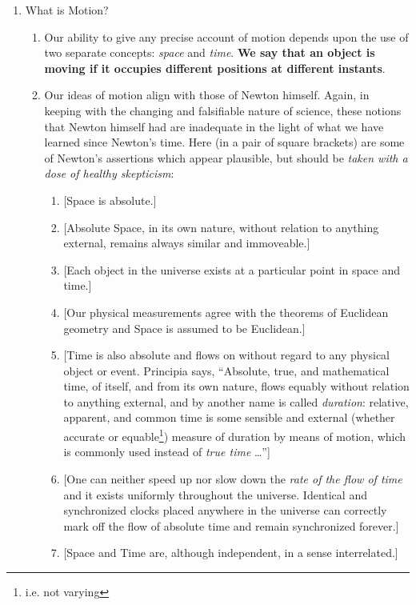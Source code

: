 \documentclass[12pt,a4paper]{book}
\begin{document}
\begin{enumerate}
    \item What is Motion?
        \begin{enumerate}
            \item Our ability to give any precise account of motion depends upon the use of two separate concepts: \emph{space} and \emph{time}. \textbf{We say that an object is moving if it occupies different positions at different instants}.
            \item Our ideas of motion align with those of Newton himself. Again, in keeping with the changing and falsifiable nature of science, these notions that Newton himself had are inadequate in the light of what we have learned since Newton's time. Here (in a pair of square brackets) are some of Newton's assertions which appear plausible, but should be \emph{taken with a dose of healthy skepticism}:
                \begin{enumerate}
                    \item {[Space is absolute.]}
                    \item {[Absolute Space, in its own nature, without relation to anything external, remains always similar and immoveable.]}
                    \item {[Each object in the universe exists at a particular point in space and time.]}
                    \item {[Our physical measurements agree with the theorems of Euclidean geometry and Space is assumed to be Euclidean.]}
                    \item {[Time is also absolute and flows on without regard to any physical object or event. Principia \cite{principia} says, ``Absolute, true, and mathematical time, of itself, and from its own nature, flows equably without relation to anything external, and by another name is called \emph{duration}: relative, apparent, and common time is some sensible and external (whether accurate or equable\footnote{i.e. not varying}) measure of duration by means of motion, which is commonly used instead of \emph{true time} \dots'']}
                    \item {[One can neither speed up nor slow down the \emph{rate of the flow of time} and it exists uniformly throughout the universe. Identical and synchronized clocks placed anywhere in the universe can correctly mark off the flow of absolute time and remain synchronized forever.]}
                    \item {[Space and Time are, although independent, in a sense interrelated.]}

\end{enumerate}
\end{enumerate}
\end{enumerate}
\end{document}
